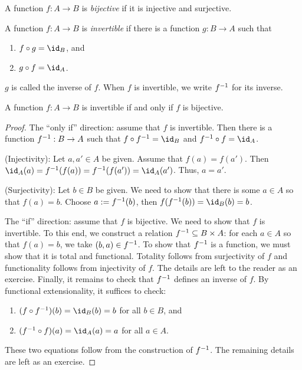 \documentclass{amsart}
\begin{document}
\begin{defn}
  A function $f : A \to B$ is \emph{bijective} if it is injective and surjective.
\end{defn}

\begin{defn}
  A function $f : A \to B$ is \emph{invertible} if there is a function $g : B \to A$ such that
  \begin{enumerate}
  \item $f \circ g = \id_{B}$, and
  \item $g \circ f = \id_{A}$.
  \end{enumerate}
  $g$ is called the inverse of $f$.
  When $f$ is invertible, we write $f^{-1}$ for its inverse.
\end{defn}

\begin{thm}
  A function $f : A \to B$ is invertible if and only if $f$ is bijective.
\end{thm}
\begin{proof}
  The ``only if'' direction: assume that $f$ is invertible.
  Then there is a function $f^{-1} : B \to A$ such that $f \circ f\inv = \id_{B}$ and $f\inv \circ f = \id_{A}$.

  (Injectivity): Let $a, a' \in A$ be given.
  Assume that $f(a) = f(a')$.
  Then $\id_{A}(a) = f\inv(f(a)) = f\inv(f(a')) = \id_{A}(a')$.
  Thus, $a = a'$.

  (Surjectivity): Let $b \in B$ be given.
  We need to show that there is some $a \in A$ so that $f(a) = b$.
  Choose $a := f^{-1}(b)$, then $f(f\inv(b)) = \id_{B}(b) = b$.

  The ``if'' direction: assume that $f$ is bijective.
  We need to show that $f$ is invertible.
  To this end, we construct a relation $f^{-1} \subseteq B \times A$: for each $a \in A$ so that $f(a) = b$, we take $(b, a) \in f^{-1}$.
  To show that $f^{-1}$ is a function, we must show that it is total and functional.
  Totality follows from surjectivity of $f$ and functionality follows from injectivity of $f$.
  The details are left to the reader as an exercise.
  Finally, it remains to check that $f^{-1}$ defines an inverse of $f$.
  By functional extensionality, it suffices to check:
  \begin{enumerate}
  \item $(f \circ f\inv)(b) = \id_{B}(b) = b$ for all $b \in B$, and
  \item $(f\inv \circ f)(a) = \id_{A}(a) = a$ for all $a \in A$.
  \end{enumerate}
  These two equations follow from the construction of $f^{-1}$.
  The remaining details are left as an exercise.
\end{proof}
\end{document}
